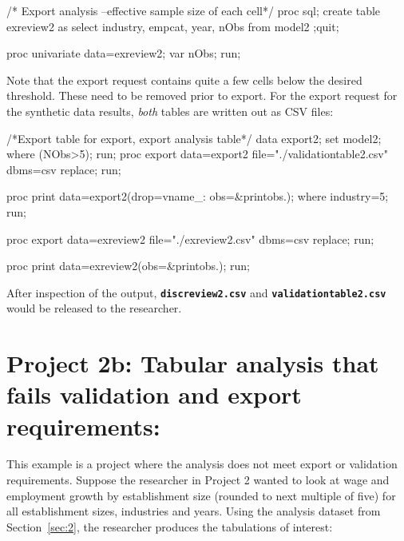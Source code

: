 \documentclass{article}
\newcommand*{\Code}[1]{\texttt{\textbf{#1}}}
\begin{document}
\begin{Datastep}
/* Export analysis --effective sample size of each cell*/
proc sql;
create table exreview2 as
select  industry, empcat, year,  nObs
from model2
;quit;
\end{Datastep}
\begin{Sascode}[store=exreview,program]
proc univariate data=exreview2;
var nObs;
run;
\end{Sascode}

Note that the export request contains quite a few cells below the desired threshold. These need to be removed prior to export. 
For the export request for the synthetic data results, \textit{both} tables are written out as CSV files:

\begin{Datastep}
/*Export table for export, export analysis table*/
data export2;
	set model2;
	where (NObs>5);
	run;
proc export data=export2
 file="./validationtable2.csv" dbms=csv replace;
run;
\end{Datastep}

\begin{Sascode}[store=paramBcsv,program]
proc print data=export2(drop=vname_: obs=&printobs.);
where industry=5;
run;
\end{Sascode}

\begin{Datastep}
proc export data=exreview2 
  file="./exreview2.csv" dbms=csv replace;
run;
\end{Datastep}

\begin{Sascode}[store=exBcsv,program]
proc print data=exreview2(obs=&printobs.);
run;
\end{Sascode}

After inspection of the output,  \Code{discreview2.csv} and \Code{validationtable2.csv} would be released to the researcher. 

\newpage
\section{Project 2b:  Tabular analysis that fails validation and export requirements:}
\label{sec:2b}
This example is a project where the analysis does not meet export or validation requirements.  Suppose the researcher in Project 2 wanted to look at wage and employment growth 
by establishment size (rounded to next multiple of five) for all establishment sizes, industries and years.
Using the analysis dataset from Section~\ref{sec:2}, the researcher produces the tabulations of interest:
\end{document}
